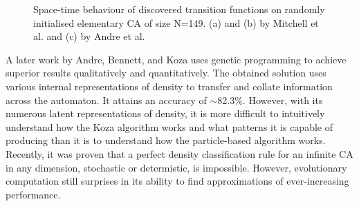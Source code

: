 \begin{figure}[!h]
\centering
            \hfill
            \hfill
            \hfill
            \caption{Space-time behaviour of discovered transition functions on randomly initialised elementary CA of size N=149. (a) and (b) by Mitchell et al.\cite{mitchell1996evolving} and (c) by Andre et al.\cite{andre1996discovery}}
\label{fig:1d-transitions}
\end{figure}

A later work by Andre, Bennett, and Koza\cite{andre1996discovery} uses genetic programming to achieve superior results qualitatively and quantitatively. The obtained solution uses various internal representations of density to transfer and collate information across the automaton. It attains an accuracy of $\sim$82.3\%. However, with its numerous latent representations of density, it is more difficult to intuitively understand how the Koza algorithm works and what patterns it is capable of producing than it is to understand how the particle-based algorithm works. Recently, it was proven that a perfect density classification rule for an infinite CA in any dimension, stochastic or determistic, is impossible\cite{buvsic2012density}. However, evolutionary computation still surprises in its ability to find approximations of ever-increasing performance. 

